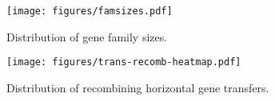 \documentclass[english]{article}
\begin{document}
\begin{figure}
\begin{center}
\texttt{[image: figures/famsizes.pdf]}
\end{center}
\vspace{-.3in}
\caption{Distribution of gene family sizes.}
\label{fig:famsize}
\end{figure}

\clearpage


\begin{figure}
\begin{center}
\texttt{[image: figures/trans-recomb-heatmap.pdf]}
\end{center}
\vspace{-1.2in}
\caption{Distribution of recombining horizontal gene transfers.}
\label{fig:mowgli-recomb-heatmap}
\end{figure}
\end{document}
